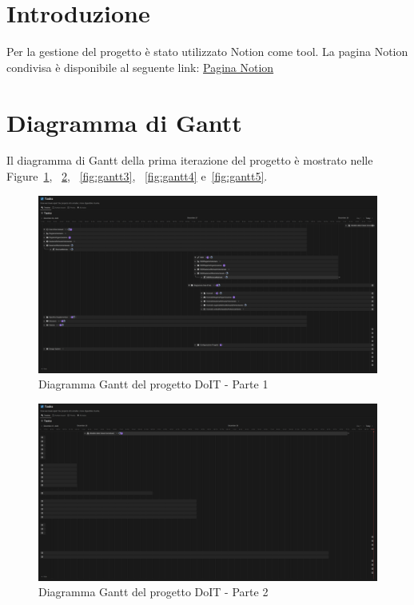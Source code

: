 \documentclass[a4paper,12pt]{report}
\begin{document}
    \section{Introduzione}\label{sec:introduzione} Per la gestione del progetto è
    stato utilizzato Notion come tool.
    La pagina Notion condivisa è disponibile al
    seguente link:
    \href{https://gabriele-workspace.notion.site/DoIT-1661d07a11eb807fb006d2f4a59f8ec0?pvs=74}{Pagina Notion}

    \section{Diagramma di Gantt}\label{sec:diagramma-di-gantt} Il diagramma di Gantt della prima iterazione
    del progetto è mostrato nelle Figure~\ref{fig:gantt1}, ~\ref{fig:gantt2}, ~\ref{fig:gantt3}, ~\ref{fig:gantt4} e~\ref{fig:gantt5}.

    \begin{figure}[h!]
        \centering
        \includegraphics[width=\textwidth]{gantt-1}
        \caption{Diagramma Gantt del progetto DoIT - Parte 1}
        \label{fig:gantt1}
    \end{figure}

    \begin{figure}[h!]
        \centering
        \includegraphics[width=\textwidth]{gantt-2}
        \caption{Diagramma Gantt del progetto DoIT - Parte 2}
        \label{fig:gantt2}
    \end{figure}
\end{document}
